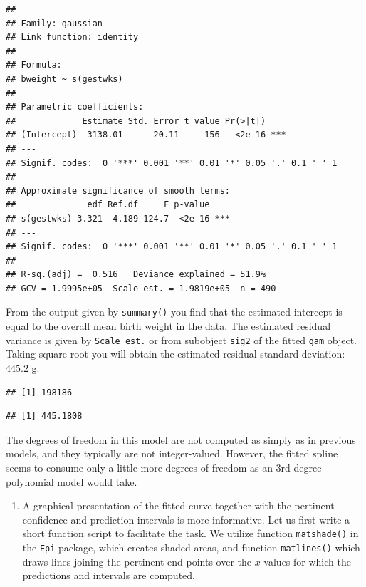 \documentclass[
]{book}
\newenvironment{Shaded}{\begin{snugshade}}{\end{snugshade}}
\newcommand{\FunctionTok}[1]{\textcolor[rgb]{0.13,0.29,0.53}{\textbf{#1}}}
\newcommand{\NormalTok}[1]{#1}
\newcommand{\SpecialCharTok}[1]{\textcolor[rgb]{0.81,0.36,0.00}{\textbf{#1}}}
\providecommand{\tightlist}{%
  \setlength{\itemsep}{0pt}\setlength{\parskip}{0pt}}
\theoremstyle{definition}
\theoremstyle{definition}
\theoremstyle{definition}
\theoremstyle{definition}
\theoremstyle{remark}
\begin{document}
\begin{verbatim}
## 
## Family: gaussian 
## Link function: identity 
## 
## Formula:
## bweight ~ s(gestwks)
## 
## Parametric coefficients:
##             Estimate Std. Error t value Pr(>|t|)    
## (Intercept)  3138.01      20.11     156   <2e-16 ***
## ---
## Signif. codes:  0 '***' 0.001 '**' 0.01 '*' 0.05 '.' 0.1 ' ' 1
## 
## Approximate significance of smooth terms:
##              edf Ref.df     F p-value    
## s(gestwks) 3.321  4.189 124.7  <2e-16 ***
## ---
## Signif. codes:  0 '***' 0.001 '**' 0.01 '*' 0.05 '.' 0.1 ' ' 1
## 
## R-sq.(adj) =  0.516   Deviance explained = 51.9%
## GCV = 1.9995e+05  Scale est. = 1.9819e+05  n = 490
\end{verbatim}

From the output given by \texttt{summary()} you find that the
estimated intercept is equal to the overall mean birth
weight in the data. The estimated residual variance is given by
\texttt{Scale\ est.} or from subobject \texttt{sig2} of the fitted
\texttt{gam} object. Taking square root you will obtain the estimated
residual standard deviation: \(445.2\) g.

\begin{Shaded}
\end{Shaded}

\begin{verbatim}
## [1] 198186
\end{verbatim}

\begin{Shaded}
\end{Shaded}

\begin{verbatim}
## [1] 445.1808
\end{verbatim}

The degrees of freedom in this model are not
computed as simply as in previous
models, and they typically are not integer-valued. However,
the fitted spline seems to consume only a little more degrees of freedom
as an 3rd degree polynomial model would take.

\begin{enumerate}
\def\labelenumi{\arabic{enumi}.}
\setcounter{enumi}{1}
\tightlist
\item
  A graphical presentation of the fitted curve together with the
  pertinent confidence and prediction intervals is more informative.
  Let us first write a
  short function script to facilitate the task. We utilize function
  \texttt{matshade()} in the \texttt{Epi} package, which creates shaded areas,
  and function \texttt{matlines()} which draws
  lines joining the pertinent end points over the \(x\)-values
  for which the predictions and intervals are computed.
\end{enumerate}
\end{document}
